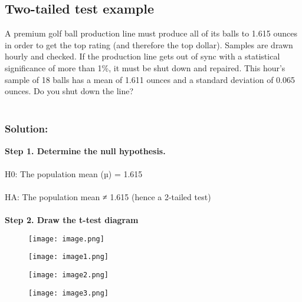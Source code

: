 \documentclass{book}
\begin{document}
\subsection*{\textbf{Two-tailed test example}}
A premium golf ball production line must produce all of its balls to 1.615 ounces in order to
get the top rating (and therefore the top dollar). Samples are drawn hourly and checked. If the
production line gets out of sync with a statistical significance of more than 1\%, it must be shut down and repaired. This hour’s sample of 18 balls has a mean of 1.611 ounces and a standard deviation of 0.065 ounces. Do you shut down the line? \\ \\
\subsubsection*{Solution:}
\textbf{Step 1. Determine the null hypothesis.}\\\\
H0: The population mean (µ) = 1.615\\\\
HA: The population mean ≠ 1.615 (hence a 2-tailed test)\\\\
\textbf{Step 2. Draw the t-test diagram}
\begin{figure}[h!]
	\texttt{[image: image.png]}
\end{figure}
\begin{figure}[h!]
	\texttt{[image: image1.png]}
\end{figure}
\begin{figure}[h!]
	\texttt{[image: image2.png]}
\end{figure}
\begin{figure}[h!]
	\texttt{[image: image3.png]}
\end{figure}
\end{document}
